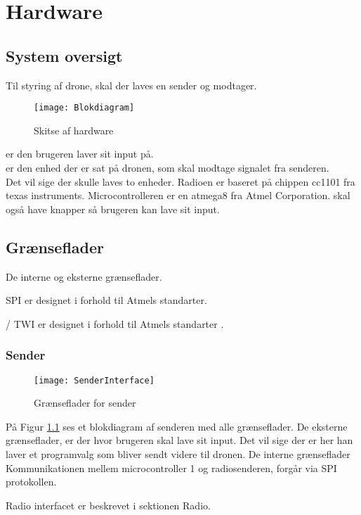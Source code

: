 \documentclass[Main]{subfiles}
\begin{document}
\chapter{Hardware}

\section{System oversigt}

Til styring af drone, skal der laves en sender og modtager.

\begin{figure}[H]
\centering
\texttt{[image: Blokdiagram]}
\caption{Skitse af hardware}
\end{figure}

 er den brugeren laver sit input på. 
\\  er den enhed der er sat på dronen, som skal modtage signalet fra senderen.\\
Det vil sige der skulle laves to enheder. Radioen er baseret på chippen cc1101 fra texas instruments. Microcontrolleren er en atmega8 fra Atmel Corporation.
 skal også have knapper så brugeren kan lave sit input.

\section{Grænseflader}
De interne og eksterne grænseflader. 

SPI er designet i forhold til Atmels standarter\cite{SPI}.

\itoc / TWI er designet i forhold til Atmels standarter \cite{Twi}.


\subsection{Sender}
\begin{figure}[H]
\centering
\texttt{[image: SenderInterface]}
\caption{Grænseflader for sender}
\label{fig: SenderInterface}
\end{figure}
På Figur \ref{fig: SenderInterface} ses et blokdiagram af senderen med alle grænseflader.
De eksterne grænseflader, er der hvor brugeren skal lave sit input. Det vil sige der er her han laver et programvalg som bliver sendt videre til dronen.
De interne grænseflader
Kommunikationen mellem microcontroller 1 og radiosenderen, forgår via SPI protokollen. 

Radio interfacet er beskrevet i sektionen Radio.
\end{document}

